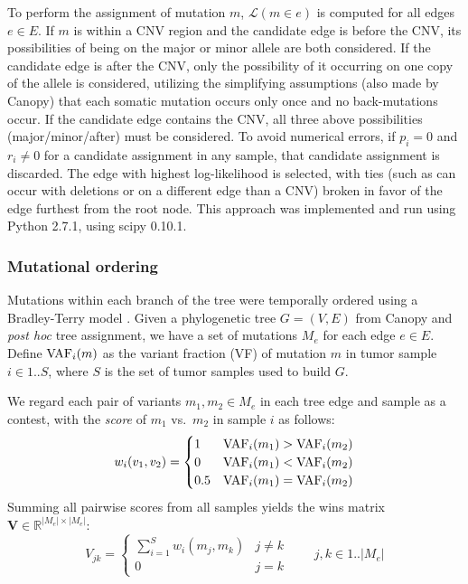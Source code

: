To perform the assignment of mutation $m$, $\mathcal{L}(m \in e)$ is computed for all edges $e \in E$. If $m$ is within a CNV region and the candidate edge is before the CNV, its possibilities of being on the major or minor allele are both considered. If the candidate edge is after the CNV, only the possibility of it occurring on one copy of the allele is considered, utilizing the simplifying assumptions (also made by Canopy) that each somatic mutation occurs only once and no back-mutations occur. If the candidate edge contains the CNV, all three above possibilities (major\slash{}minor\slash{}after) must be considered. To avoid numerical errors, if $p_i = 0$ and $r_i \neq 0$ for a candidate assignment in any sample, that candidate assignment is discarded. The edge with highest log-likelihood is selected, with ties (such as can occur with deletions or on a different edge than a CNV) broken in favor of the edge furthest from the root node. This approach was implemented and run using Python 2.7.1, using scipy \cite{2020SciPy-NMeth} 0.10.1.

\subsubsection{Mutational ordering}
\label{ssec:240:mutational_ordering}
Mutations within each branch of the tree were temporally ordered using a Bradley-Terry model \cite{terry52}. Given a phylogenetic tree $G = (V, E)$ from Canopy and \textit{post hoc} tree assignment, we have a set of mutations $M_e$ for each edge $e \in E$. Define $\operatorname{VAF}_i(m)$ as the variant fraction (VF) of mutation $m$ in tumor sample $i \in 1..S$, where $S$ is the set of tumor samples used to build $G$.

We regard each pair of variants $m_1, m_2 \in M_e$ in each tree edge and sample as a contest, with the \emph{score} of $m_1$ vs.\ $m_2$ in sample $i$ as follows:
\begin{equation}
	w_i(v_1, v_2) = 
	\begin{cases}
		1 & \operatorname{VAF}_i(m_1) > \operatorname{VAF}_i(m_2) \\
		0 & \operatorname{VAF}_i(m_1) < \operatorname{VAF}_i(m_2) \\
		0.5 & \operatorname{VAF}_i(m_1) = \operatorname{VAF}_i(m_2)
	\end{cases}
\end{equation}
Summing all pairwise scores from all samples yields the wins matrix $\mathbf{V} \in \mathbb{R}^{|M_e| \times |M_e|}$:
\begin{equation}
	V_{jk} = \begin{cases} \sum_{i=1}^S w_i(m_j, m_k) & j \ne k \\ 0 & j = k \end{cases} \qquad j, k \in 1..|M_e|
\end{equation}

